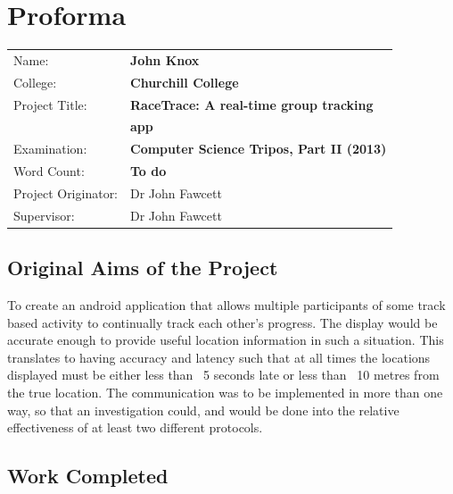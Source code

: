 
\setcounter{page}{1}
\pagestyle{plain}

\chapter*{Proforma}

{\large
\begin{tabular}{ll}
Name:               & \bf John Knox                                 \\
College:            & \bf Churchill College                         \\
Project Title:      & \bf RaceTrace: A real-time group tracking                   \\
                    & \bf app                        \\
Examination:        & \bf Computer Science Tripos, Part II (2013)   \\
Word Count:         & \bf To do\footnotemark[1]                     \\
Project Originator: & Dr John Fawcett                               \\
Supervisor:         & Dr John Fawcett                               \\ 
\end{tabular}
}


\section*{Original Aims of the Project}

To create an android application that allows multiple participants of some track based activity to continually track each other's progress. The display would be accurate enough to provide useful location information in such a situation. This translates to having accuracy and latency such that at all times the locations displayed must be either less than ~5 seconds late or less than ~10 metres from the true location.
The communication was to be implemented in more than one way, so that an investigation could, and would be done into the relative effectiveness of at least two different protocols.


\section*{Work Completed}

